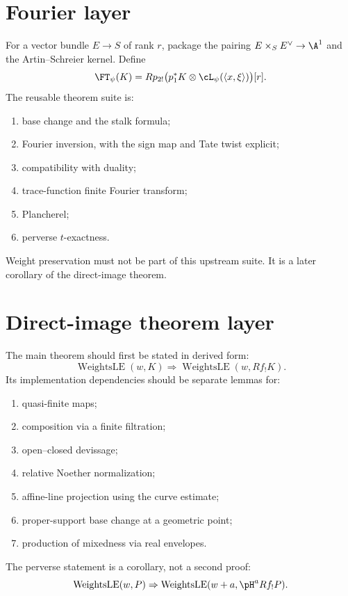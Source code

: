 \section{Fourier layer}

For a vector bundle \(E\to S\) of rank \(r\), package the pairing
\(E\times_SE^\vee\to\A^1\) and the Artin--Schreier kernel.  Define
\[
 \FT_\psi(K)=
 Rp_{2!}\bigl(p_1^*K\otimes\cL_\psi(\langle x,\xi\rangle)\bigr)[r].
\]
The reusable theorem suite is:

\begin{enumerate}
\item base change and the stalk formula;
\item Fourier inversion, with the sign map and Tate twist explicit;
\item compatibility with duality;
\item trace-function finite Fourier transform;
\item Plancherel;
\item perverse \(t\)-exactness.
\end{enumerate}

Weight preservation must not be part of this upstream suite.  It is a later
corollary of the direct-image theorem.

\section{Direct-image theorem layer}

The main theorem should first be stated in derived form:
\[
 \operatorname{WeightsLE}(w,K)
 \Longrightarrow
 \operatorname{WeightsLE}(w,Rf_!K).
\]
Its implementation dependencies should be separate lemmas for:

\begin{enumerate}
\item quasi-finite maps;
\item composition via a finite filtration;
\item open--closed devissage;
\item relative Noether normalization;
\item affine-line projection using the curve estimate;
\item proper-support base change at a geometric point;
\item production of mixedness via real envelopes.
\end{enumerate}

The perverse statement is a corollary, not a second proof:
\[
 \operatorname{WeightsLE}(w,P)
 \Rightarrow
 \operatorname{WeightsLE}(w+a,\pH^aRf_!P).
\]

